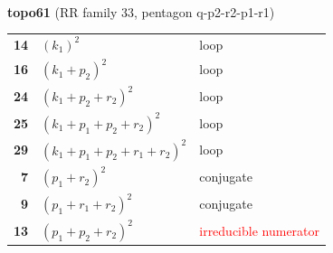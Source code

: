\documentclass[10pt]{article}
\begin{document}
\begin{minipage}[t]{0.48\textwidth}
{}\\[2mm]\textbf{topo61} (RR family 33, pentagon q-p2-r2-p1-r1)\\[2pt]{\footnotesize\begin{tabular}{@{}r@{\ \ }l@{\ \ }l@{}}\textbf{14} & $(k_1)^2$ & loop\\
\textbf{16} & $(k_1+p_2)^2$ & loop\\
\textbf{24} & $(k_1+p_2+r_2)^2$ & loop\\
\textbf{25} & $(k_1+p_1+p_2+r_2)^2$ & loop\\
\textbf{29} & $(k_1+p_1+p_2+r_1+r_2)^2$ & loop\\
\textbf{7} & $(p_1+r_2)^2$ & conjugate\\
\textbf{9} & $(p_1+r_1+r_2)^2$ & conjugate\\
\textbf{13} & $(p_1+p_2+r_2)^2$ & \textcolor{red}{irreducible numerator}\\\end{tabular}}\end{minipage}\hfill%
\end{document}
